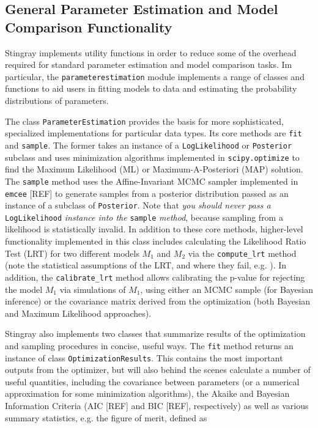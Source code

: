 \documentclass[12pt]{emulateapj}
\begin{document}
\subsection{General Parameter Estimation and Model Comparison Functionality}

Stingray implements utility functions in order to reduce some of the overhead required for standard parameter estimation and model comparison tasks. Im particular, the \verb|parameterestimation| module implements a range of classes and functions to aid users in fitting models to data and estimating the probability distributions of parameters.

The class \verb|ParameterEstimation| provides the basis for more sophisticated, specialized implementations for particular data types. Its core methods are \verb|fit| and \verb|sample|. The former takes an instance of a \verb|LogLikelihood| or \verb|Posterior| subclass and uses minimization algorithms implemented in \verb|scipy.optimize| to find the Maximum Likelihood (ML) or Maximum-A-Posteriori (MAP) solution. The \verb|sample| method uses the Affine-Invariant MCMC sampler implemented in \verb|emcee| [REF] to generate samples from a posterior distribution passed as an instance of a subclass of \verb|Posterior|. Note that \textit{you should never pass a} \verb|LogLikelihood| \textit{instance into the} \verb|sample| \textit{method}, because sampling from a likelihood is statistically invalid. In addition to these core methods, higher-level functionality implemented in this class includes calculating the Likelihood Ratio Test (LRT) for two different models $M_1$ and $M_2$ via the \verb|compute_lrt| method (note the statistical assumptions of the LRT, and where they fail, e.g. \citealt{protassov2002}). In addition, the \verb|calibrate_lrt| method allows calibrating the p-value for rejecting the model $M_1$ via simulations of $M_1$, using either an MCMC sample (for Bayesian inference) or the covariance matrix derived from the optimization (both Bayesian and Maximum Likelihood approaches).

Stingray also implements two classes that summarize results of the optimization and sampling procedures in concise, useful ways. The \verb|fit| method returns an instance of class \verb|OptimizationResults|. This contains the most important outputs from the optimizer, but will also behind the scenes calculate a number of useful quantities, including the covariance between parameters (or a numerical approximation for some minimization algorithms), the Akaike and Bayesian Information Criteria (AIC [REF] and BIC [REF], respectively) as well as various summary statistics, e.g. the figure of merit, defined as 
\end{document}
